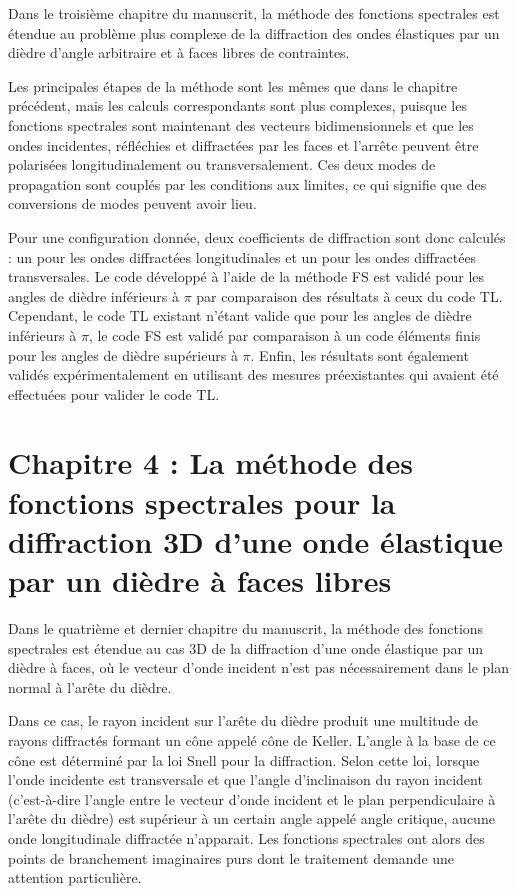 Dans le troisième chapitre du manuscrit, la méthode des fonctions spectrales est étendue au problème plus complexe de la diffraction des ondes élastiques par un dièdre d'angle arbitraire et à faces libres de contraintes.

Les principales étapes de la méthode sont les mêmes que dans le chapitre précédent, mais les calculs correspondants sont plus complexes, puisque les fonctions spectrales sont maintenant des vecteurs bidimensionnels et que les ondes incidentes, réfléchies et diffractées par les faces et l'arrête peuvent être polarisées longitudinalement ou transversalement. Ces deux modes de propagation sont couplés par les conditions aux limites, ce qui signifie que des conversions de modes peuvent avoir lieu. 

Pour une configuration donnée, deux coefficients de diffraction sont donc calculés : un pour les ondes diffractées longitudinales et un pour les ondes diffractées transversales. Le code développé à l'aide de la méthode FS est validé pour les angles de dièdre inférieurs à $\pi$ par comparaison des résultats à ceux du code TL. Cependant, le code TL existant n'étant valide que pour les angles de dièdre inférieurs à $\pi$, le code FS est validé par comparaison à un code éléments finis pour les angles de dièdre supérieurs à $\pi$. Enfin, les résultats sont également validés expérimentalement en utilisant des mesures préexistantes qui avaient été effectuées pour valider le code TL.

\section[Résumé du chapitre 4]{Chapitre 4 : La méthode des fonctions spectrales pour la diffraction 3D d'une onde élastique par un dièdre à faces libres}

Dans le quatrième et dernier chapitre du manuscrit, la méthode des fonctions spectrales est étendue au cas 3D de la diffraction d'une onde élastique par un dièdre à faces, où le vecteur d'onde incident n'est pas nécessairement dans le plan normal à l'arête du dièdre. 

Dans ce cas, le rayon incident sur l'arête du dièdre produit une multitude de rayons diffractés formant un cône appelé cône de Keller. L'angle à la base de ce cône est déterminé par la loi Snell pour la diffraction. Selon cette loi, lorsque l'onde incidente est transversale et que l'angle d'inclinaison du rayon incident (c'est-à-dire l'angle entre le vecteur d'onde incident et le plan perpendiculaire à l'arête du dièdre) est supérieur à un certain angle appelé angle critique, aucune onde longitudinale diffractée n'apparait. Les fonctions spectrales ont alors des points de branchement imaginaires purs dont le traitement demande une attention particulière. 


